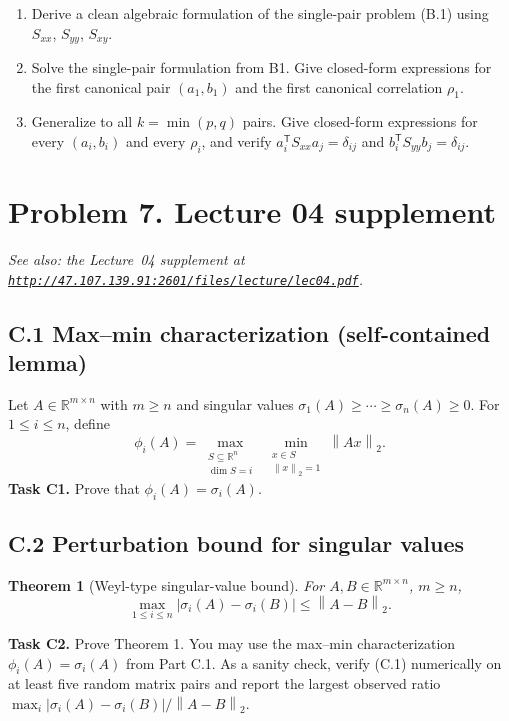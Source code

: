 \documentclass[11pt]{article}
\newcommand{\R}{\mathbb{R}}
\newcommand{\norm}[1]{\left\lVert #1\right\rVert}
\newcommand{\T}{^{\mathsf T}}
\newtheorem{theorem}{Theorem}
\begin{document}
\begin{enumerate}[label=\textbf{B\arabic*.}]
\item Derive a clean algebraic formulation of the single-pair problem
      (B.1) using $S_{xx}$, $S_{yy}$, $S_{xy}$.
\item Solve the single-pair formulation from B1. Give closed-form 
      expressions for the first canonical pair $(a_1, b_1)$ and the
      first canonical correlation $\rho_1$.
\item Generalize to all $k = \min(p, q)$ pairs. Give closed-form
      expressions for every $(a_i, b_i)$ and every $\rho_i$, and verify
      $a_i\T S_{xx} a_j = \delta_{ij}$ and
      $b_i\T S_{yy} b_j = \delta_{ij}$.
\end{enumerate}

\section*{Problem 7. Lecture 04 supplement}
\textit{See also: the Lecture~04 supplement at
\href{http://47.107.139.91:2601/files/lecture/lec04.pdf}{\texttt{http://47.107.139.91:2601/files/lecture/lec04.pdf}}.}

\subsection*{C.1 Max--min characterization (self-contained lemma)}
Let $A\in\R^{m\times n}$ with $m\ge n$ and singular values
$\sigma_1(A)\ge\cdots\ge\sigma_n(A)\ge0$. For $1\le i\le n$, define
\[
 \phi_i(A)=\max_{\substack{S\subseteq\R^n\\\dim S=i}}
       \;\min_{\substack{x\in S\\\norm{x}_2=1}}\norm{Ax}_2.
\]
\textbf{Task C1.} Prove that $\phi_i(A)=\sigma_i(A)$.

\subsection*{C.2 Perturbation bound for singular values}
\begin{theorem}[Weyl-type singular-value bound]
For $A,B\in\R^{m\times n}$, $m\ge n$,
\[
 \max_{1\le i\le n}\left|\sigma_i(A)-\sigma_i(B)\right|\le\norm{A-B}_2. \tag{C.1}
\]
\end{theorem}

\textbf{Task C2.} Prove Theorem 1. You may use the max--min characterization
$\phi_i(A)=\sigma_i(A)$ from Part C.1. As a sanity check, verify (C.1)
numerically on at least five random matrix pairs and report the largest
observed ratio $\max_i|\sigma_i(A)-\sigma_i(B)| / \norm{A-B}_2$.
\end{document}
